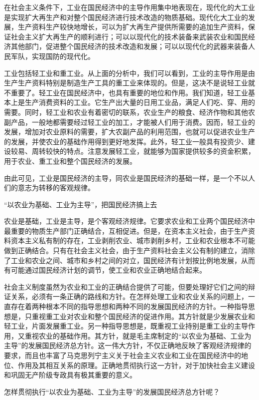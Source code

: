 \documentclass{book}
\begin{document}
在社会主义条件下，工业在国民经济中的主导作用集中地表现在，现代化的大工业是实现扩大再生产和对整个国民经济进行技术改造的物质基础。现代化大工业的发展，生产资料生产较快地增长，可以为扩大再生产提供所需要的追加生产资料，保证社会主义扩大再生产的顺利进行；可以以现代化的技术装备来武装农业和国民经济其他部门，促进整个国民经济的技术改造和发展；可以以现代化的武器来装备人民军队，实现国防的现代化。

工业包括轻工业和重工业。从上面的分析中，我们可以看到，工业的主导作用是由生产生产资料特别是制造生产工具的重工业来体现的。但是，这决不是说轻工业就不重要了。轻工业在国民经济中，也具有重要的地位和作用。我们知道，轻工业基本上是生产消费资料的工业。它生产出大量的日用工业品，满足人们吃、穿、用的需要。同时，轻工业和农业有着密切的联系，农业生产的粮食、经济作物和其他农副产品，一般地都需要经过轻工业的加工，才能被人们用于消费。因而，轻工业的发展，增加对农业原料的需要，扩大农副产品的利用范围，也就可以促进农业生产的发展，并使农业的基础作用得到更好地发挥。此外，轻工业一般具有投资少、建设较易、周转较快的特点。注意发展轻工业，就能够为国家提供较多的资金积累，用于农业、重工业和整个国民经济的发展。

由此可见，工业是国民经济的主导，同农业是国民经济的基础一样，是一个不以人们的意志为转移的客观规律。

“以农业为基础、工业为主导”，把国民经济搞上去

农业是基础，工业是主导，是个客观经济规律。它要求农业和工业两个国民经济中最重要的物质生产部门正确结合，互相促进。但是，在资本主义社会，由于生产资料资本主义私有制的存在，工业剥削农业、城市剥削乡村，工业和农业根本不可能做到正确结合。只有在社会主义社会，由于生产资料社会主义公有制的建立，消除了工业和农业之间、城市和乡村之间的对立，国民经济有计划按比例地发展，从而有可能通过国民经济计划的调节，使工业和农业正确地结合起来。

社会主义制度虽然为农业和工业的正确结合提供了可能，但要处理好它们之间的辩证关系，必须有一条正确的路线和方针。在怎样处理工业和农业关系的问题上，一直存在着两种根本不同的指导思想和两种不同的发展国民经济的方针。一种指导思想是，只重视重工业对农业和整个国民经济的促进作用。其方针就是少发展农业和轻工业，片面发展重工业。另一种指导思想是，既重视工业持别是重工业的主导作用，又重视农业的基础作用。其方针，就是毛主席制定的“以农业为基础、工业为主导”的发展国民经济总方针。这一伟大方针，不仅正确地反映了客观经济规律的要求，而且也丰富了马克思列宁主义关于社会主义农业和工业在国民经济中的地位、作用及其相互关系的原理。正确地贯彻执行这一方针，对于加快社会主义建设和巩固无产阶级专政具有极其重要的意义。

怎样贯彻执行“以农业为基础、工业为主导”的发展国民经济总方针呢？
\end{document}
